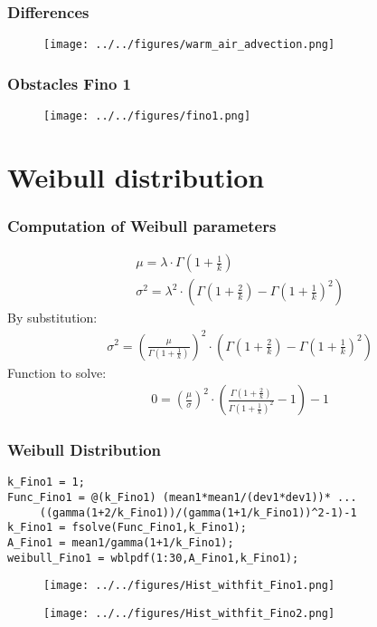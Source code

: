 \documentclass[12pt,t]{beamer}
\begin{document}
\begin{frame}
\frametitle{Differences}
\begin{figure}[H]
\centering
\texttt{[image: ../../figures/warm\_air\_advection.png]}
\label{fig:weatherpattern}
\end{figure}
\end{frame}


\begin{frame}
\frametitle{Obstacles Fino 1}
\begin{figure}[H]
\centering
\texttt{[image: ../../figures/fino1.png]}
\label{fig:fino1}
\end{figure} 
\end{frame}


\section{Weibull distribution}

\begin{frame}
\frametitle{Computation of Weibull parameters}
\begin{align*}
&\mu = \lambda \cdot \Gamma\left(1+\frac{1}{k}\right) \\
&\sigma^2 = \lambda^2 \cdot \left(\Gamma\left(1+\frac{2}{k}\right)-\Gamma\left(1+\frac{1}{k}\right)^2\right)
\end{align*}
By substitution:
\begin{align*}
&\sigma^2 = \left(\frac{\mu}{\Gamma(1+\frac{1}{k})}\right)^2 \cdot \left(\Gamma\left({1+\frac{2}{k}}\right)-\Gamma\left(1+\frac{1}{k}\right)^2\right)
\end{align*}
Function to solve:
\begin{align*}
&0 = \left(\frac{\mu}{\sigma}\right)^2 \cdot \left(\frac{\Gamma\left({1+\frac{2}{k}}\right)}{\Gamma\left(1+\frac{1}{k}\right)^2}-1\right)-1
\end{align*}
\end{frame}

\begin{frame}[fragile]
\frametitle{Weibull Distribution}
\begin{lstlisting}
k_Fino1 = 1;
Func_Fino1 = @(k_Fino1) (mean1*mean1/(dev1*dev1))* ...
     ((gamma(1+2/k_Fino1))/(gamma(1+1/k_Fino1))^2-1)-1 
k_Fino1 = fsolve(Func_Fino1,k_Fino1);
A_Fino1 = mean1/gamma(1+1/k_Fino1);
weibull_Fino1 = wblpdf(1:30,A_Fino1,k_Fino1);
\end{lstlisting}
\begin{figure}[htbp]
	\begin{center}
		\begin{minipage}[t]{0.49\linewidth}
			\centering
		  \texttt{[image: ../../figures/Hist\_withfit\_Fino1.png]}
			\label{histo1}
		\end{minipage}
		\begin{minipage}[t]{0.49\linewidth}
		  \centering
		  \texttt{[image: ../../figures/Hist\_withfit\_Fino2.png]}
			\label{histo2}
		\end{minipage}
	\end{center}
\end{figure}
\end{frame}
\end{document}
